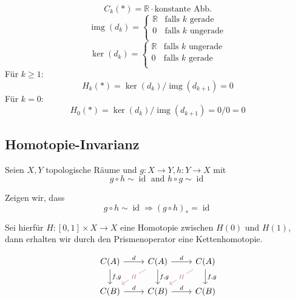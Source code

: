 \documentclass{article}
\DeclareMathOperator{\img}{img}
\DeclareMathOperator{\id}{id}
\begin{document}
	\begin{equation*}
		C_k(*) = ℝ · \text{konstante Abb.}
	\end{equation*}
	\begin{equation*}
		\img(d_k) = \begin{cases}
			ℝ & \text{falls $k$ gerade}\\
			0 & \text{falls $k$ ungerade}\\
		\end{cases}	
	\end{equation*}
	\begin{equation*}
		\ker(d_k) = \begin{cases}
			ℝ & \text{falls $k$ ungerade}\\
			0 & \text{falls $k$ gerade}\\
		\end{cases}
	\end{equation*}
	Für $k≥1$:
	\begin{equation*}
		H_k(*) = \ker(d_k) / \img(d_{k+1}) = 0
	\end{equation*}
	Für $k=0$:
	\begin{equation*}
		H_0(*) = \ker(d_k) / \img(d_{k+1}) = 0/0 = 0
	\end{equation*}
	
	\subsection{Homotopie-Invarianz}
	
	Seien $X, Y$ topologische Räume und $g: X→Y, h: Y→X$ mit
	\begin{equation*}
		g ∘ h \sim \id \text{ and } h∘g \sim \id
	\end{equation*}
	
	Zeigen wir, dass
	\begin{equation*}
		g∘h \sim \id ⇒ (g∘h)_* = \id
	\end{equation*}
	
	Sei hierfür $H: [0,1] × X → X$ eine Homotopie zwischen $H(0)$ und $H(1)$, dann erhalten wir durch den Prismenoperator eine Kettenhomotopie.
	
	\[\begin{tikzcd}
		{C(A)} & {C(A)} & {C(A)} \\
		{C(B)} & {C(B)} & {C(B)}
		\arrow["d", from=1-1, to=1-2]
		\arrow["{f,g}", from=1-1, to=2-1]
		\arrow["d", from=1-2, to=1-3]
		\arrow["H"{description}, color={rgb,255:red,214;green,92;blue,92}, from=1-2, to=2-1]
		\arrow["{f,g}", from=1-2, to=2-2]
		\arrow["H"{description}, color={rgb,255:red,214;green,92;blue,92}, from=1-3, to=2-2]
		\arrow["{f,g}", from=1-3, to=2-3]
		\arrow["d", from=2-1, to=2-2]
		\arrow["d", from=2-2, to=2-3]
	\end{tikzcd}\]
	
\end{document}
